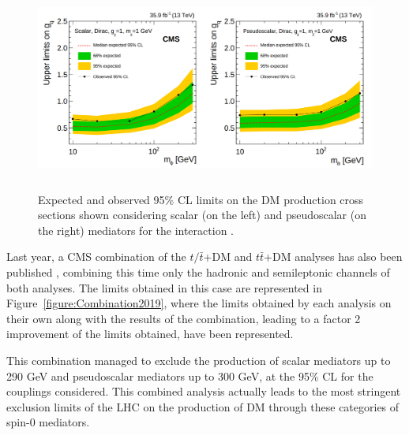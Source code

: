\documentclass[a4paper, 10pt, openright]{report}
\begin{document}
\begin{figure}[htbp]
\begin{center}
\includegraphics[width=16cm, height=6.8cm]{figs/CMSttbarExclusion.png}
\caption{Expected and observed 95\% \ac{CL} limits on the \ac{DM} production cross sections shown considering scalar (on the left) and pseudoscalar (on the right) mediators for the interaction \cite{PreviousDoubleTopAllLep13CMS}.}
\label{figure:CMSttbarExclusion}
\end{center}
\end{figure}

Last year, a \ac{CMS} combination of the $t/\bar t$+DM and $t \bar t$+DM analyses has also been published \cite{PreviousSingleDoubleTopAllLep13CMS}, combining this time only the hadronic and semileptonic channels of both analyses. The limits obtained in this case are represented in Figure~\ref{figure:Combination2019}, where the limits obtained by each analysis on their own along with the results of the combination, leading to a factor 2 improvement of the limits obtained, have been represented. 

This combination managed to exclude the production of scalar mediators up to 290 GeV and pseudoscalar mediators up to 300 GeV, at the 95\% \ac{CL} for the couplings considered. This combined analysis actually leads to the most stringent exclusion limits of the \ac{LHC} on the production of \ac{DM} through these categories of spin-0 mediators.
\end{document}
